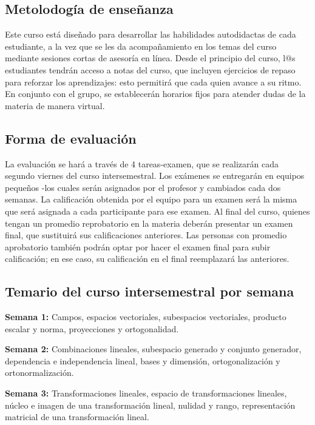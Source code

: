 \documentclass[12pt,dvipsnames]{article}
\begin{document}
\subsection{Metolodogía de enseñanza}

Este curso está diseñado para desarrollar las habilidades autodidactas de cada estudiante, a la vez que se les da acompañamiento en los temas del curso mediante sesiones cortas de asesoría en línea. Desde el principio del curso, l@s estudiantes tendrán acceso a notas del curso, que incluyen ejercicios de repaso para reforzar los aprendizajes: esto permitirá que cada quien avance a su ritmo. En conjunto con el grupo, se establecerán horarios fijos para atender dudas de la materia de manera virtual.

\subsection{Forma de evaluación}

La evaluación se hará a través de 4 tareas-examen, que se realizarán cada segundo viernes del curso intersemestral. Los exámenes se entregarán en equipos pequeños -los cuales serán asignados por el profesor y cambiados cada dos semanas. La calificación obtenida por el equipo para un examen será la misma que será asignada a cada participante para ese examen. Al final del curso, quienes tengan un promedio reprobatorio en la materia deberán presentar un examen final, que sustituirá sus calificaciones anteriores. Las personas con promedio aprobatorio también podrán optar por hacer el examen final para subir calificación; en ese caso, su calificación en el final reemplazará las anteriores.

\subsection{Temario del curso intersemestral por semana}

\textbf{Semana 1:} Campos, espacios vectoriales, subespacios vectoriales, producto escalar y norma, proyecciones y ortogonalidad.

\vspace{3mm}

\textbf{Semana 2:} Combinaciones lineales, subespacio generado y conjunto generador, dependencia e independencia lineal, bases y dimensión, ortogonalización y ortonormalización.

\vspace{3mm}

\textbf{Semana 3:} Transformaciones lineales, espacio de transformaciones lineales, núcleo e imagen de una transformación lineal, nulidad y rango, representación matricial de una transformación lineal.
\end{document}

